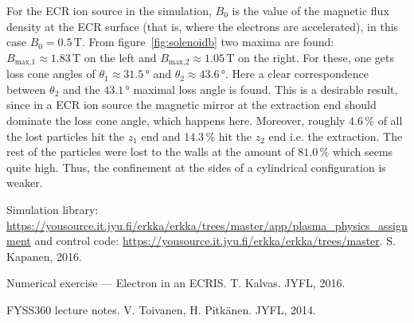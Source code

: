 \documentclass[12pt, a4paper]{article}
\begin{document}
For the ECR ion source in the simulation, $B_0$ is the value of the magnetic flux density at the ECR surface (that is, where the electrons are accelerated), in this case $B_0 = 0.5\,\si{\tesla}$. From figure~\ref{fig:solenoidb} two maxima are found: $B_\text{max,1} \approx 1.83\,\si{\tesla}$ on the left and $B_\text{max,2} \approx 1.05\,\si{\tesla}$ on the right. For these, one gets loss cone angles of $\theta_1 \approx 31.5\,\si{\degree}$ and $\theta_2 \approx 43.6\,\si{\degree}$. Here a clear correspondence between $\theta_2$ and the $43.1\,\si{\degree}$ maximal loss angle is found. This is a desirable result, since in a ECR ion source the magnetic mirror at the extraction end should dominate the loss cone angle, which happens here. Moreover, roughly $4.6\,\si{\percent}$ of all the lost particles hit the $z_1$ end and $14.3\,\si{\percent}$ hit the $z_2$ end i.e. the extraction. The rest of the particles were lost to the walls at the amount of $81.0\,\si{\percent}$ which seems quite high. Thus, the confinement at the sides of a cylindrical configuration is weaker.

\begin{thebibliography}{9}
        Simulation library: \url{https://yousource.it.jyu.fi/erkka/erkka/trees/master/app/plasma_physics_assignment} and control code: \url{https://yousource.it.jyu.fi/erkka/erkka/trees/master}. S. Kapanen, 2016.

        Numerical exercise --- Electron in an ECRIS. T. Kalvas. JYFL, 2016.

        FYSS360 lecture notes. V. Toivanen, H. Pitkänen. JYFL, 2014.
\end{thebibliography}
\end{document}

